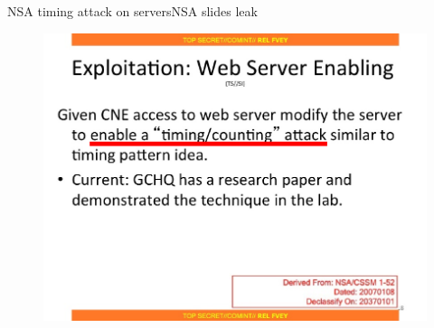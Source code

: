 \begin{frame}{NSA timing attack on servers}{NSA slides leak}
	\begin{figure}
		\centering
		\includegraphics[scale=0.40]{imgs/nsa_timing2.png}
	\end{figure}
\end{frame}

